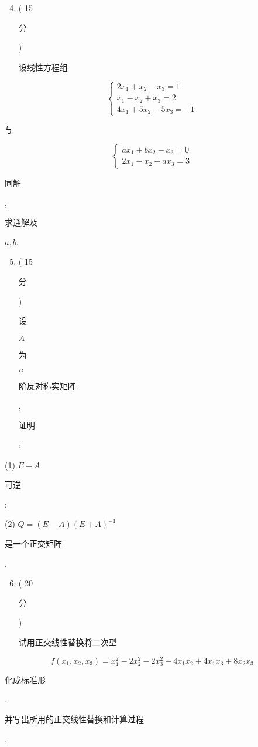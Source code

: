 \documentclass[10pt]{article}
\begin{document}
\begin{enumerate}
  \setcounter{enumi}{3}
  \item ( 15 \begin{CJK}{UTF8}{mj}分\end{CJK}) \begin{CJK}{UTF8}{mj}设线性方程组\end{CJK}
\end{enumerate}
$$
\left\{\begin{array}{l}
2 x_{1}+x_{2}-x_{3}=1 \\
x_{1}-x_{2}+x_{3}=2 \\
4 x_{1}+5 x_{2}-5 x_{3}=-1
\end{array}\right.
$$
\begin{CJK}{UTF8}{mj}与\end{CJK}
$$
\left\{\begin{array}{l}
a x_{1}+b x_{2}-x_{3}=0 \\
2 x_{1}-x_{2}+a x_{3}=3
\end{array}\right.
$$
\begin{CJK}{UTF8}{mj}同解\end{CJK}, \begin{CJK}{UTF8}{mj}求通解及\end{CJK} $a, b$.

\begin{enumerate}
  \setcounter{enumi}{4}
  \item ( 15 \begin{CJK}{UTF8}{mj}分\end{CJK}) \begin{CJK}{UTF8}{mj}设\end{CJK} $A$ \begin{CJK}{UTF8}{mj}为\end{CJK} $n$ \begin{CJK}{UTF8}{mj}阶反对称实矩阵\end{CJK}, \begin{CJK}{UTF8}{mj}证明\end{CJK}:
\end{enumerate}
(1) $E+A$ \begin{CJK}{UTF8}{mj}可逆\end{CJK};

(2) $Q=(E-A)(E+A)^{-1}$ \begin{CJK}{UTF8}{mj}是一个正交矩阵\end{CJK}.

\begin{enumerate}
  \setcounter{enumi}{5}
  \item ( 20 \begin{CJK}{UTF8}{mj}分\end{CJK}) \begin{CJK}{UTF8}{mj}试用正交线性替换将二次型\end{CJK}
\end{enumerate}
$$
f\left(x_{1}, x_{2}, x_{3}\right)=x_{1}^{2}-2 x_{2}^{2}-2 x_{3}^{2}-4 x_{1} x_{2}+4 x_{1} x_{3}+8 x_{2} x_{3}
$$
\begin{CJK}{UTF8}{mj}化成标准形\end{CJK}, \begin{CJK}{UTF8}{mj}并写出所用的正交线性替换和计算过程\end{CJK}.
\end{document}
